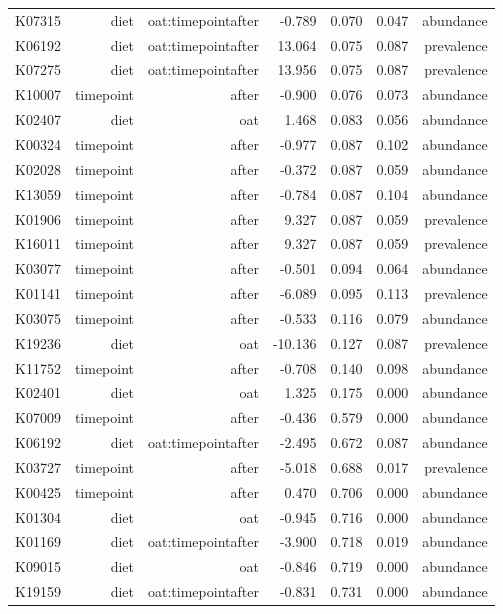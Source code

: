 \documentclass[
]{article}
\begin{document}
\begin{longtable}[t]{lrrrrrr}
K07315 & diet & oat:timepointafter & -0.789 & 0.070 & 0.047 & abundance\\
K06192 & diet & oat:timepointafter & 13.064 & 0.075 & 0.087 & prevalence\\
\addlinespace
K07275 & diet & oat:timepointafter & 13.956 & 0.075 & 0.087 & prevalence\\
K10007 & timepoint & after & -0.900 & 0.076 & 0.073 & abundance\\
K02407 & diet & oat & 1.468 & 0.083 & 0.056 & abundance\\
K00324 & timepoint & after & -0.977 & 0.087 & 0.102 & abundance\\
K02028 & timepoint & after & -0.372 & 0.087 & 0.059 & abundance\\
\addlinespace
K13059 & timepoint & after & -0.784 & 0.087 & 0.104 & abundance\\
K01906 & timepoint & after & 9.327 & 0.087 & 0.059 & prevalence\\
K16011 & timepoint & after & 9.327 & 0.087 & 0.059 & prevalence\\
K03077 & timepoint & after & -0.501 & 0.094 & 0.064 & abundance\\
K01141 & timepoint & after & -6.089 & 0.095 & 0.113 & prevalence\\
\addlinespace
K03075 & timepoint & after & -0.533 & 0.116 & 0.079 & abundance\\
K19236 & diet & oat & -10.136 & 0.127 & 0.087 & prevalence\\
K11752 & timepoint & after & -0.708 & 0.140 & 0.098 & abundance\\
K02401 & diet & oat & 1.325 & 0.175 & 0.000 & abundance\\
K07009 & timepoint & after & -0.436 & 0.579 & 0.000 & abundance\\
\addlinespace
K06192 & diet & oat:timepointafter & -2.495 & 0.672 & 0.087 & abundance\\
K03727 & timepoint & after & -5.018 & 0.688 & 0.017 & prevalence\\
K00425 & timepoint & after & 0.470 & 0.706 & 0.000 & abundance\\
K01304 & diet & oat & -0.945 & 0.716 & 0.000 & abundance\\
K01169 & diet & oat:timepointafter & -3.900 & 0.718 & 0.019 & abundance\\
\addlinespace
K09015 & diet & oat & -0.846 & 0.719 & 0.000 & abundance\\
K19159 & diet & oat:timepointafter & -0.831 & 0.731 & 0.000 & abundance\\

\end{longtable}
\end{document}
